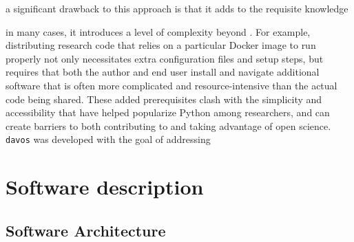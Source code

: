 \documentclass[preprint,12pt, a4paper]{elsarticle}
\begin{document}


a significant drawback to this approach is that it adds to the requisite knowledge 




in many cases, it introduces a level of complexity beyond . For example, distributing research code that relies on a particular Docker image to run properly not only necessitates extra configuration files and setup steps, but requires that both the author and end user install and navigate additional software that is often more complicated and resource-intensive than the actual code being shared. These added prerequisites clash with the simplicity and accessibility that have helped popularize Python among researchers, and can create barriers to both contributing to and taking advantage of open science. \texttt{davos} was developed with the goal of addressing 







\section{Software description}


\subsection{Software Architecture}
\end{document}

